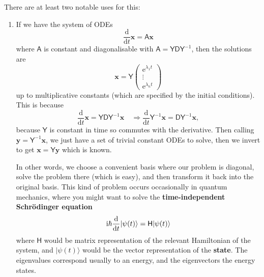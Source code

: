 \documentclass[letter-paper]{tufte-book}
\newenvironment{example}[1][Example]{\begin{trivlist}
\item[\hskip \labelsep {\bfseries #1}]}{\end{trivlist}}
\newcommand{\ex}{\mathrm{e}}
\newcommand{\zi}{{\rm i}}
\newcommand{\As}{{\mathsf{A}}}
\newcommand{\Ds}{{\mathsf{D}}}
\newcommand{\Ys}{{\mathsf{Y}}}
\newcommand{\xb}{{\boldsymbol{x}}}
\newcommand{\yb}{{\boldsymbol{y}}}
\begin{document}
There are at least two notable uses for this:
\begin{example}
  \begin{enumerate}
    \item If we have the system of ODEs
    \begin{equation*}
      \frac{\mathrm{d}}{\mathrm{d}t}\xb = \As\xb
    \end{equation*}
    where $\As$ is constant and diagonalisable with $\As = \Ys \Ds \Ys^{-1}$, then the solutions are
    \begin{equation*}
      \xb = \Ys\begin{pmatrix}\ex^{\lambda_1 t} \\ \vdots \\ \ex^{\lambda_n t}\end{pmatrix}
    \end{equation*}
    up to multiplicative constants (which are specified by the initial conditions). This is because
    \begin{equation*}
      \frac{\mathrm{d}}{\mathrm{d}t}\xb = \Ys \Ds \Ys^{-1}\xb \quad \Rightarrow \frac{\mathrm{d}}{\mathrm{d}t} \Ys^{-1}\xb = \Ds\Ys^{-1}\xb,
    \end{equation*}
    because $\Ys$ is constant in time so commutes with the derivative. Then calling $\yb = \Ys^{-1}\xb$, we just have a set of trivial constant ODEs to solve, then we invert to get $\xb = \Ys\yb$ which is known. 
    
    In other words, we choose a convenient basis where our problem is diagonal, solve the problem there (which is easy), and then transform it back into the original basis. This kind of problem occurs occasionally in quantum mechanics, where you might want to solve the \textbf{time-independent Schr\"odinger equation}
    \begin{equation*}
      \zi\hbar\frac{\mathrm{d}}{\mathrm{d}t}|\psi(t)\rangle = \mathsf{H}|\psi(t)\rangle
    \end{equation*}
    where $\mathsf{H}$ would be matrix representation of the relevant Hamiltonian of the system, and $|\psi(t)\rangle$ would be the vector representation of the \textbf{state}. The eigenvalues correspond usually to an energy, and the eigenvectors the energy states.
    

\end{enumerate}
\end{example}
\end{document}
